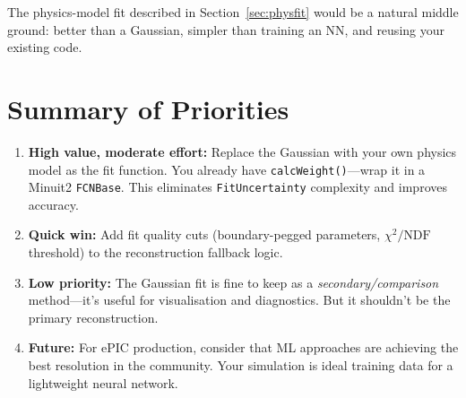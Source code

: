 \documentclass[11pt,a4paper]{article}
\newcommand{\code}[1]{\texttt{#1}}
\newcommand{\file}[1]{\texttt{#1}}
\begin{document}
\noindent
The physics-model fit described in Section~\ref{sec:physfit} would be a
natural middle ground: better than a Gaussian, simpler than training an
NN, and reusing your existing code.

\section{Summary of Priorities}

\begin{enumerate}[nosep]
  \item \textbf{High value, moderate effort:}\quad
    Replace the Gaussian with your own physics model as the fit function.
    You already have \code{calcWeight()}---wrap it in a Minuit2
    \code{FCNBase}.  This eliminates \file{FitUncertainty} complexity and
    improves accuracy.

  \item \textbf{Quick win:}\quad
    Add fit quality cuts (boundary-pegged parameters,
    $\chi^{2}/\text{NDF}$ threshold) to the reconstruction fallback
    logic.

  \item \textbf{Low priority:}\quad
    The Gaussian fit is fine to keep as a \emph{secondary/comparison}
    method---it's useful for visualisation and diagnostics.  But it
    shouldn't be the primary reconstruction.

  \item \textbf{Future:}\quad
    For ePIC production, consider that ML approaches are achieving the
    best resolution in the community.  Your simulation is ideal training
    data for a lightweight neural network.
\end{enumerate}
\end{document}
